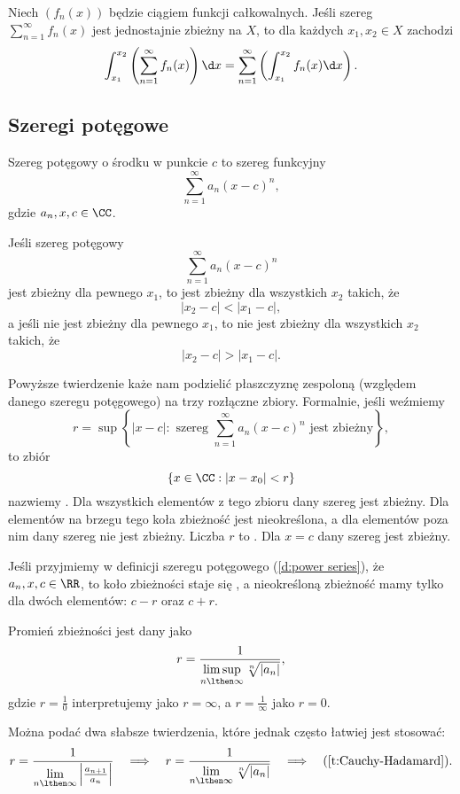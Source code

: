 \begin{theorem}
    Niech $(f_n(x))$ będzie ciągiem funkcji całkowalnych. Jeśli szereg $\sum_{n=1}^\infty f_n(x)$ jest jednostajnie zbieżny na $X$, to dla każdych $x_1, x_2 \in X$ zachodzi
    \[ \int_{x_1}^{x_2}\left(\sum_{n=1}^\infty f_n(x)\right)\d x = \sum_{n=1}^\infty \left(\int_{x_1}^{x_2}f_n(x)\d x\right). \]
\end{theorem}

\subsection{Szeregi potęgowe}
\begin{definition}
    \label{d:power series}
    Szereg potęgowy o środku w punkcie $c$ to szereg funkcyjny
    \[ \sum_{n=1}^\infty a_n(x - c)^n, \]
    gdzie $a_n, x, c \in \CC$.
\end{definition}

\begin{theorem}
    Jeśli szereg potęgowy
    \[ \sum_{n=1}^\infty a_n(x - c)^n \]
    jest zbieżny dla pewnego $x_1$, to jest zbieżny dla wszystkich $x_2$ takich, że
    \[ |x_2 - c| < |x_1 - c|, \]
    a jeśli nie jest zbieżny dla pewnego $x_1$, to nie jest zbieżny dla wszystkich $x_2$ takich, że
    \[ |x_2 - c| > |x_1 - c|. \]
\end{theorem}

Powyższe twierdzenie każe nam podzielić płaszczyznę zespoloną (względem danego szeregu potęgowego) na trzy rozłączne zbiory. Formalnie, jeśli weźmiemy
\[ r = \sup\left\{|x - c| : \text{ szereg } \sum_{n=1}^\infty a_n(x - c)^n \text{ jest zbieżny}\right\}, \]
to zbiór
\[ \{x \in \CC : |x - x_0| < r\} \]
nazwiemy . Dla wszystkich elementów z tego zbioru dany szereg jest zbieżny. Dla elementów na brzegu tego koła zbieżność jest nieokreślona, a dla elementów poza nim dany szereg nie jest zbieżny. Liczba $r$ to . Dla $x=c$ dany szereg jest zbieżny.

\begin{remark*}
    Jeśli przyjmiemy w definicji szeregu potęgowego (\ref{d:power series}), że $a_n, x, c \in \RR$, to koło zbieżności staje się , a nieokreśloną zbieżność mamy tylko dla dwóch elementów: $c - r$ oraz $c + r$.
\end{remark*}

\begin{theorem}
    \label{t:Cauchy-Hadamard}
    Promień zbieżności jest dany jako
    \[ r = \frac{1}{\limsup\limits_{n\lthen\infty}\sqrt[n]{|a_n|}}, \]
    gdzie $r = \frac{1}{0}$ interpretujemy jako $r = \infty$, a $r = \frac{1}{\infty}$ jako $r = 0$.
\end{theorem}

Można podać dwa słabsze twierdzenia, które jednak często łatwiej jest stosować:
\[ r = \frac{1}{\lim\limits_{n\lthen\infty} \left|\frac{a_{n+1}}{a_n}\right|} \hspace{1em}\Longrightarrow\hspace{1em} r = \frac{1}{\lim\limits_{n\lthen\infty}\sqrt[n]{|a_n|}} \hspace{1em}\Longrightarrow\hspace{1em} (\ref{t:Cauchy-Hadamard}). \]